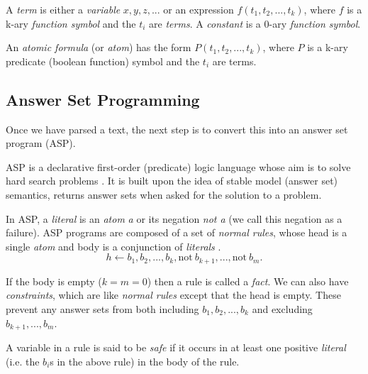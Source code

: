 \begin{definition}
A \textit{term} is either a \textit{variable} $x,y,z,...$ or an expression $f(t_1,t_2,...,t_k)$, where $f$ is a k-ary \textit{function symbol} and the $t_i$ are \textit{terms}. A \textit{constant} is a 0-ary \textit{function symbol}.
\end{definition}

\begin{definition}
An \textit{atomic formula} (or \textit{atom}) has the form $P(t_1,t_2,...,t_k)$, where $P$ is a k-ary predicate (boolean function) symbol and the $t_i$ are terms.
\end{definition}

\subsection{Answer Set Programming}

Once we have parsed a text, the next step is to convert this into an answer set program (ASP).

ASP is a declarative first-order (predicate) logic language whose aim is to solve hard search problems \cite{lifschitz_what_nodate}. It is built upon the idea of stable model (answer set) semantics, returns answer sets when asked for the solution to a problem.

In ASP, a \textit{literal} is an \textit{atom} \textit{a} or its negation \textit{not a} (we call this negation as a failure). ASP programs are composed of a set of \textit{normal rules}, whose head is a single \textit{atom} and body is a conjunction of \textit{literals} \cite{law_representing_2019}.
\begin{equation}
h \leftarrow b_1, b_2, ..., b_k, \text{not}\ b_{k+1}, ..., \text{not}\ b_m.
\end{equation}

If the body is empty ($k = m = 0$) then a rule is called a \textit{fact}. We can also have \textit{constraints}, which are like \textit{normal rules} except that the head is empty. These prevent any answer sets from both including $b_1, b_2, ..., b_k$ and excluding $b_{k+1}, ..., b_m$.

\begin{definition}
A variable in a rule is said to be \textit{safe} if it occurs in at least one positive \textit{literal} (i.e. the $b_i$s in the above rule) in the body of the rule.
\end{definition}

